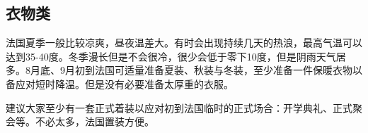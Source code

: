 \subsection{衣物类}

法国夏季一般比较凉爽，昼夜温差大。有时会出现持续几天的热浪，最高气温可以达到35-40度。冬季漫长但是不会很冷，很少会低于零下10度，但是阴雨天气居多。8月底、9月初到法国可适量准备夏装、秋装与冬装，至少准备一件保暖衣物以备应对短时降温。但是没有必要准备太厚重的衣服。

建议大家至少有一套正式着装以应对初到法国临时的正式场合：开学典礼、正式聚会等。不必太多，法国置装方便。
